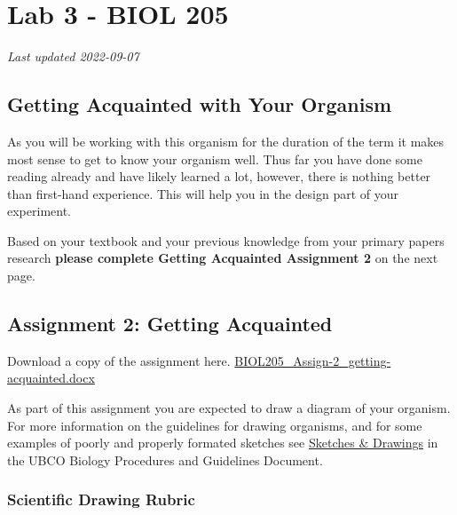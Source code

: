 \documentclass[
]{book}
\begin{document}
\hypertarget{part-lab-3---biol-205}{%
\part*{Lab 3 - BIOL 205}\label{part-lab-3---biol-205}}

\emph{Last updated 2022-09-07}

\hypertarget{getting-acquainted-with-your-organism}{%
\chapter*{Getting Acquainted with Your Organism}\label{getting-acquainted-with-your-organism}}

As you will be working with this organism for the duration of the term it makes most sense to get to know your organism well. Thus far you have done some reading already and have likely learned a lot, however, there is nothing better than first-hand experience. This will help you in the design part of your experiment.

Based on your textbook and your previous knowledge from your primary papers research \textbf{please complete Getting Acquainted Assignment 2} on the next page.

\hypertarget{assignment-2-getting-acquainted}{%
\chapter*{Assignment 2: Getting Acquainted}\label{assignment-2-getting-acquainted}}

Download a copy of the assignment here. \href{https://osf.io/download/xz2rk}{BIOL205\_Assign-2\_getting-acquainted.docx}

As part of this assignment you are expected to draw a diagram of your organism. For more information on the guidelines for drawing organisms, and for some examples of poorly and properly formated sketches see \href{https://ubco-biology.github.io/Procedures-and-Guidelines/sketches-drawings.html}{Sketches \& Drawings} in the UBCO Biology Procedures and Guidelines Document.

\hypertarget{scientific-drawing-rubric}{%
\section*{Scientific Drawing Rubric}\label{scientific-drawing-rubric}}
\end{document}
